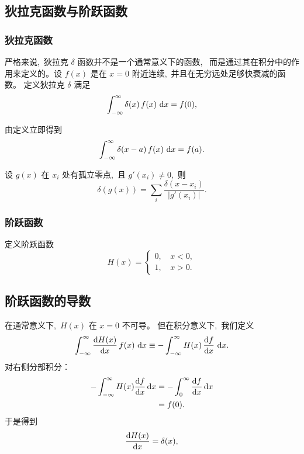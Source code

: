 \subsection{狄拉克函数与阶跃函数}

\subsubsection{狄拉克函数}

严格来说, \,狄拉克 $\delta$ 函数并不是一个通常意义下的函数, \,
而是通过其在积分中的作用来定义的。设 $f(x)$ 是在 $x=0$ 附近连续, \,并且在无穷远处足够快衰减的函数。
定义狄拉克 $\delta$ 满足
\begin{equation}
\int_{-\infty}^{\infty} \delta(x)\,f(x)\,\dif x = f(0),
\end{equation}


由定义立即得到
\begin{equation}
\int_{-\infty}^{\infty} \delta(x-a)\,f(x)\,\dif x = f(a).
\end{equation}



设 $g(x)$ 在 $x_i$ 处有孤立零点, \,且 $g'(x_i)\neq 0$, \,则
\begin{equation}
\delta(g(x)) = \sum_i \frac{\delta(x-x_i)}{|g'(x_i)|}.
\end{equation}


\subsubsection{阶跃函数}

定义阶跃函数
\begin{equation}
H(x)=
\begin{cases}
0, \,& x<0,\\
1, \,& x>0.
\end{cases}
\end{equation}

\subsection{阶跃函数的导数}

在通常意义下, \,$H(x)$ 在 $x=0$ 不可导。
但在积分意义下, \,我们定义
\begin{equation}
\int_{-\infty}^{\infty} \frac{\dif H(x)}{\dif x}\,f(x)\,\dif x
\equiv
-\int_{-\infty}^{\infty} H(x)\,\frac{\dif f}{\dif x}\,\dif x.
\end{equation}
对右侧分部积分：
\begin{align}
-\int_{-\infty}^{\infty} H(x)\frac{\dif f}{\dif x}\dif x
&=
-\int_0^{\infty} \frac{\dif f}{\dif x}\dif x\nonumber \\
&= f(0).
\end{align}
于是得到
\begin{equation}
\frac{\dif H(x)}{\dif x} = \delta(x),
\end{equation}
